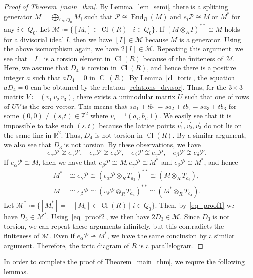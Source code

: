 \documentclass[11pt]{amsart}
\theoremstyle{definition}
\newcommand{\calM}{\mathcal{M}}
\newcommand{\calP}{\mathcal{P}}
\newcommand{\ZZ}{\mathbb{Z}}
\newcommand{\RR}{\mathbb{R}}
\DeclareMathOperator{\Cl}{Cl}
\DeclareMathOperator{\End}{End}
\begin{document}
\begin{proof}[Proof of Theorem~\ref{main_thm}]
By Lemma~\ref{lem_semi}, there is a splitting generator $M=\bigoplus_{i\in Q_0}M_i$ such that $\calP\cong\End_R(M)$ and $e_i\calP\cong M$ or $M^*$ for any $i\in Q_0$. Let $\calM\coloneqq\{[M_i]\in\Cl(R)\mid i\in Q_0\}$. If $(M\otimes_RI)^{**}\cong M$ holds for a divisorial ideal $I$, then we have $[I]\in\calM$ because $M$ is a generator. Using the above isomorphism again, we have $2[I]\in\calM$. Repeating this argument, we see that $[I]$ is a torsion element in $\Cl(R)$ because of the finiteness of $\calM$. Here, we assume that $D_4$ is torsion in $\Cl(R)$, and hence there is a positive integer $a$ such that $aD_4=0$ in $\Cl(R)$. By Lemma~\ref{cl_toric}, the equation $aD_4=0$ can be obtained by the relation~\eqref{relations_divisor}. Thus, for the $3\times 3$ matrix $V\coloneqq(v_1\,v_2\,v_3)$, there exists a unimodular matrix $U$ such that one of rows of $UV$ is the zero vector. This means that $sa_1+tb_1=sa_2+tb_2=sa_3+tb_3$ for some $(0,0){\neq}(s,t)\in\ZZ^2$ where $v_i={}^t(a_i,b_i,1)$. We easily see that it is impossible to take such $(s,t)$ because the lattice points $v_1^\prime,v_2^\prime,v_3^\prime$ do not lie on the same line in $\RR^2$. Thus, $D_4$ is not torsion in $\Cl(R)$. By a similar argument, we also see that $D_3$ is not torsion. By these observations, we have
\[
e_\alpha\calP\not\cong e_\gamma\calP,\quad e_\alpha\calP\not\cong e_\delta\calP,\quad e_\beta\calP\not\cong e_\gamma\calP,\quad e_\beta\calP\not\cong e_\delta\calP.
\]
If $e_\alpha\calP\cong M$, then we have that $e_\beta\calP\cong M, e_\gamma\calP\cong M^*$ and $e_\delta\calP\cong M^*$, and hence
\begin{align}\label{eq_proof1}
M^*&\cong e_\gamma\calP\cong(e_\alpha\calP\otimes_RT_{a_3})^{**}\cong(M\otimes_RT_{a_3}),
\\
\label{eq_proof2}
M&\cong e_\beta\calP\cong(e_\delta\calP\otimes_RT_{a_4})^{**}\cong(M^*\otimes_RT_{a_4}).
\end{align}
Let $\calM^*\coloneqq\{[M_i^*]=-[M_i]\in\Cl(R)\mid i\in Q_0\}$. Then, by~\eqref{eq_proof1} we have $D_3\in\calM^*$. Using~\eqref{eq_proof2}, we then have $2D_3\in\calM$. Since $D_3$ is not torsion, we can repeat these arguments infinitely, but this contradicts the finiteness of $\calM$. Even if $e_\alpha\calP\cong M^*$, we have the same conclusion by a similar argument. Therefore, the toric diagram of $R$ is a parallelogram.
\end{proof}


In order to complete the proof of Theorem~\ref{main_thm}, we requre the following lemmas.
\end{document}
